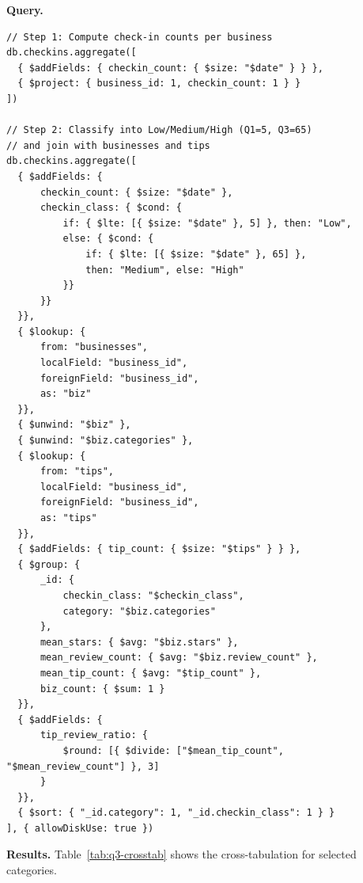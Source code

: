 \documentclass[11pt]{article}
\begin{document}
\textbf{Query.}
\begin{lstlisting}[style=mongo, caption={MongoDB pipeline for check-in cross-tabulation.}, label={lst:q3-crosstab}]
// Step 1: Compute check-in counts per business
db.checkins.aggregate([
  { $addFields: { checkin_count: { $size: "$date" } } },
  { $project: { business_id: 1, checkin_count: 1 } }
])

// Step 2: Classify into Low/Medium/High (Q1=5, Q3=65)
// and join with businesses and tips
db.checkins.aggregate([
  { $addFields: {
      checkin_count: { $size: "$date" },
      checkin_class: { $cond: {
          if: { $lte: [{ $size: "$date" }, 5] }, then: "Low",
          else: { $cond: {
              if: { $lte: [{ $size: "$date" }, 65] },
              then: "Medium", else: "High"
          }}
      }}
  }},
  { $lookup: {
      from: "businesses",
      localField: "business_id",
      foreignField: "business_id",
      as: "biz"
  }},
  { $unwind: "$biz" },
  { $unwind: "$biz.categories" },
  { $lookup: {
      from: "tips",
      localField: "business_id",
      foreignField: "business_id",
      as: "tips"
  }},
  { $addFields: { tip_count: { $size: "$tips" } } },
  { $group: {
      _id: {
          checkin_class: "$checkin_class",
          category: "$biz.categories"
      },
      mean_stars: { $avg: "$biz.stars" },
      mean_review_count: { $avg: "$biz.review_count" },
      mean_tip_count: { $avg: "$tip_count" },
      biz_count: { $sum: 1 }
  }},
  { $addFields: {
      tip_review_ratio: {
          $round: [{ $divide: ["$mean_tip_count", "$mean_review_count"] }, 3]
      }
  }},
  { $sort: { "_id.category": 1, "_id.checkin_class": 1 } }
], { allowDiskUse: true })
\end{lstlisting}

\textbf{Results.} Table~\ref{tab:q3-crosstab} shows the cross-tabulation for selected categories.
\end{document}
